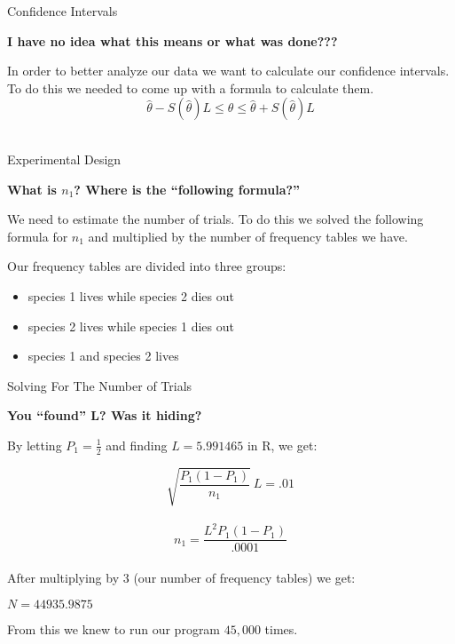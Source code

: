 \begin{frame}{Confidence Intervals}

  \textbf{I have no idea what this means or what was done???}

  In order to better analyze our data we want to calculate our
  confidence intervals. 
  To do this we needed to come up with a formula to calculate them. \\

  $$\hat{\theta} - S(\hat{\theta}) L \leq \theta \leq \hat{\theta} + S(\hat{\theta}) L$$ \\
\end{frame}

\begin{frame}{Experimental Design}

  \textbf{What is $n_1$? Where is the ``following formula?''}

  We need to estimate the number of trials. To do this we solved the following formula for $n_1$
  and multiplied by the number of frequency tables we have.

\vfill

Our frequency tables are divided into three groups:
\begin{itemize}
	\item species 1 lives while species 2 dies out
	\item species 2 lives while species 1 dies out
	\item species 1 and species 2 lives
\end{itemize}

\vfill 

\end{frame}

\begin{frame}{Solving For The Number of Trials}

  \textbf{You ``found'' L? Was it hiding?}

  By letting $P_1 = \frac{1}{2}$ and finding $L = 5.991465$ in R, we get:

  $$\sqrt{\frac{P_1 (1-P_1)}{n_1}} \ L = .01$$ \\
  $$n_1 = \frac{L^2 P_1 (1-P_1)}{.0001}$$ \\
  After multiplying by $3$ (our number of frequency tables) we get: \\
  \begin{center} 
    $N = 44935.9875$ 
  \end{center} 

  From this we knew to run our program $45,000$ times. 
\end{frame}



